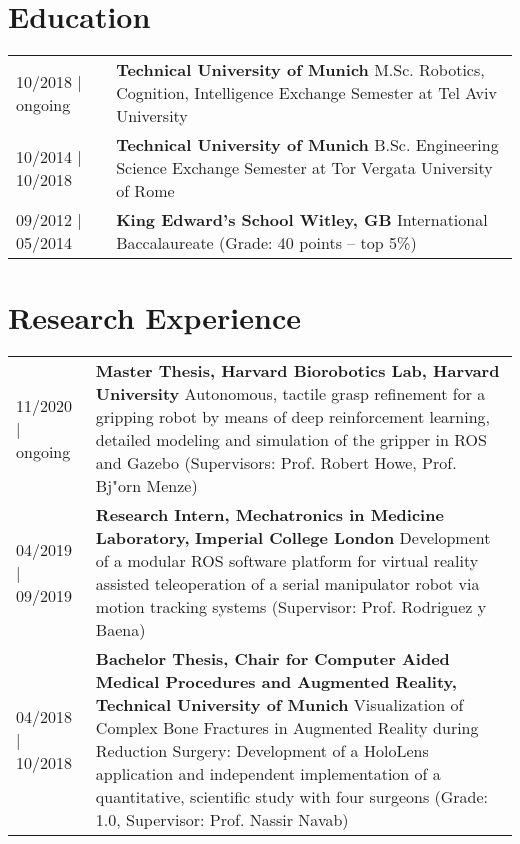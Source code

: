 \documentclass{article}
\begin{document}
\setlength{\extrarowheight}{6pt}

\section*{Education}
\begin{tabularx}{\textwidth}{@{}lX}

10/2018 | ongoing &  \textbf{Technical University of Munich} \newline
                  	 M.Sc. Robotics, Cognition, Intelligence \newline 
                  	 Exchange Semester at Tel Aviv University \\
10/2014 | 10/2018 &  \textbf{Technical University of Munich} \newline
                  	 B.Sc. Engineering Science \newline 
                  	 Exchange Semester at Tor Vergata University of Rome \\
09/2012 | 05/2014 &  \textbf{King Edward's School Witley, GB} \newline
                  	 International Baccalaureate (Grade: 40 points -- top 5\%) \\
\end{tabularx}

\section*{Research Experience}
\begin{tabularx}{\textwidth}{@{}lX}
11/2020 | ongoing &  \textbf{Master Thesis, Harvard Biorobotics Lab, Harvard University}\newline 
					 Autonomous, tactile grasp refinement for a gripping robot by means of deep reinforcement learning, detailed modeling and simulation of the  gripper in ROS and Gazebo (Supervisors: Prof. Robert Howe, Prof. Bj"orn Menze) \\

04/2019 | 09/2019 &  \textbf{Research Intern, Mechatronics in Medicine Laboratory, } \newline 
					 \textbf{Imperial College London} \newline
					 Development of a modular ROS software platform for virtual reality assisted teleoperation of a serial manipulator robot via motion tracking systems (Supervisor: Prof. Rodriguez y Baena) \\
04/2018 | 10/2018 &  \textbf{Bachelor Thesis, Chair for Computer Aided Medical Procedures and Augmented Reality, Technical University of Munich} \newline
                  	 Visualization of Complex Bone Fractures in Augmented Reality during Reduction Surgery: Development of a HoloLens application and independent implementation of a quantitative, scientific study with four surgeons  (Grade: 1.0, Supervisor: Prof. Nassir Navab)  \\                
\end{tabularx}
\end{document}
